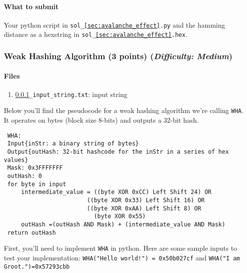 \documentclass[letterpaper,12pt]{report}
\begin{document}
\smallskip
\noindent

\paragraph{What to submit}
Your python script in {\tt sol\_\ref{sec:avalanche_effect}.py} and the hamming distance as a hexstring in {\tt sol\_\ref{sec:avalanche_effect}.hex}.

\subsubsection{Weak Hashing Algorithm (3 points)  \hfill\rm\normalsize (\emph{Difficulty: Medium})}
\label{sec:wha}
\paragraph{Files}

\begin{enumerate}
\item {\tt \ref{sec:wha}\_input\_string.txt}: input string
\end{enumerate}

Below you'll find the pseudocode for a weak hashing algorithm we're calling {\tt WHA}. It operates on bytes (block size 8-bits) and outputs a 32-bit hash. 
\begin{mdframed}
\begin{verbatim}
 WHA:
 Input{inStr: a binary string of bytes}
 Output{outHash: 32-bit hashcode for the inStr in a series of hex values}
 Mask: 0x3FFFFFFF
 outHash: 0
 for byte in input
 	 intermediate_value = ((byte XOR 0xCC) Left Shift 24) OR 
                        ((byte XOR 0x33) Left Shift 16) OR 
                        ((byte XOR 0xAA) Left Shift 8) OR 
 	                      (byte XOR 0x55)
 	 outHash =(outHash AND Mask) + (intermediate_value AND Mask)
 return outHash
\end{verbatim}
\end{mdframed}

\noindent
First, you'll need to implement {\tt WHA} in python. Here are some sample inputs to test your implementation: {\tt WHA("Hello world!") = 0x50b027cf} and {\tt WHA("I am Groot.")=0x57293cbb}
\end{document}
